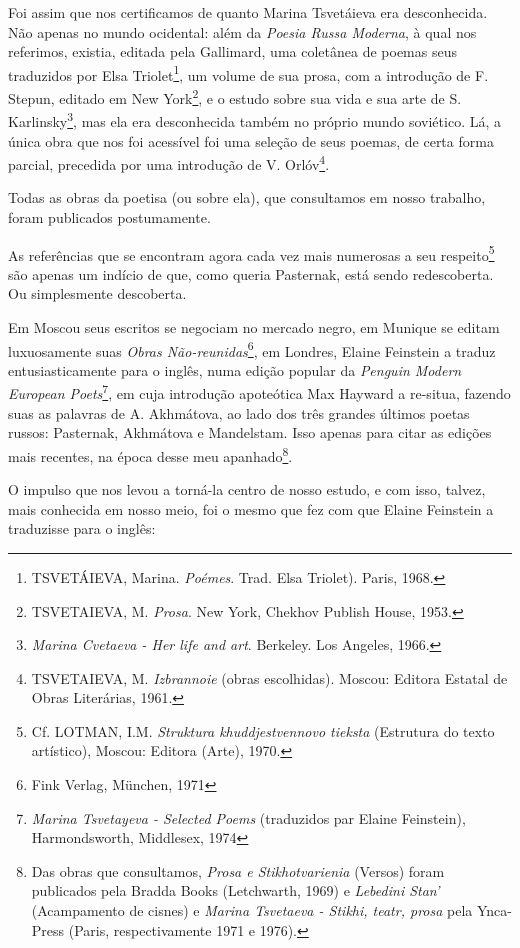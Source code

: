 Foi assim que nos certificamos de quanto Marina Tsvetáieva era
desconhecida. Não apenas no mundo ocidental: além da \emph{Poesia Russa
Moderna}, à qual nos referimos, existia, editada pela Gallimard, uma
coletânea de poemas seus traduzidos por Elsa Triolet\footnote{TSVETÁIEVA,
  Marina. \emph{Poémes}. Trad. Elsa Triolet). Paris, 1968.}, um volume
de sua prosa, com a introdução de F. Stepun, editado em New
York\footnote{TSVETAIEVA, M. \emph{Prosa}. New York, Chekhov Publish
  House, 1953.}, e o estudo sobre sua vida e sua arte de S.
Karlinsky\footnote{\emph{Marina Cvetaeva - Her life and art}. Berkeley.
  Los Angeles, 1966.}, mas ela era desconhecida também no próprio mundo
soviético. Lá, a única obra que nos foi acessível foi uma seleção de
seus poemas, de certa forma parcial, precedida por uma introdução de V.
Orlóv\footnote{TSVETAIEVA, M. \emph{Izbrannoie} (obras escolhidas).
  Moscou: Editora Estatal de Obras Literárias, 1961.}.

Todas as obras da poetisa (ou sobre ela), que consultamos em nosso
trabalho, foram publicados postumamente.

As referências que se encontram agora cada vez mais numerosas a seu
respeito\footnote{Cf. LOTMAN, I.M. \emph{Struktura khuddjestvennovo
  tieksta} (Estrutura do texto artístico), Moscou: Editora (Arte), 1970.}
são apenas um indício de que, como queria Pasternak, está sendo
redescoberta. Ou simplesmente descoberta.

Em Moscou seus escritos se negociam no mercado negro, em Munique se
editam luxuosamente suas \emph{Obras Não-reunidas}\footnote{Fink Verlag,
  München, 1971}, em Londres, Elaine Feinstein a traduz
entusiasticamente para o inglês, numa edição popular da \emph{Penguin
Modern European Poets}\footnote{\emph{Marina Tsvetayeva - Selected
  Poems} (traduzidos par Elaine Feinstein), Harmondsworth, Middlesex,
  1974}, em cuja introdução apoteótica Max Hayward a re-situa, fazendo
suas as palavras de A. Akhmátova, ao lado dos três grandes últimos
poetas russos: Pasternak, Akhmátova e Mandelstam. Isso apenas para citar
as edições mais recentes, na época desse meu apanhado\footnote{Das obras
  que consultamos, \emph{Prosa e Stikhotvarienia} (Versos) foram
  publicados pela Bradda Books (Letchwarth, 1969) e \emph{Lebedini
  Stan'} (Acampamento de cisnes) e \emph{Marina Tsvetaeva - Stikhi,
  teatr, prosa} pela Ynca-Press (Paris, respectivamente 1971 e 1976).}.

O impulso que nos levou a torná-la centro de nosso estudo, e com isso,
talvez, mais conhecida em nosso meio, foi o mesmo que fez com que Elaine
Feinstein a traduzisse para o inglês:


